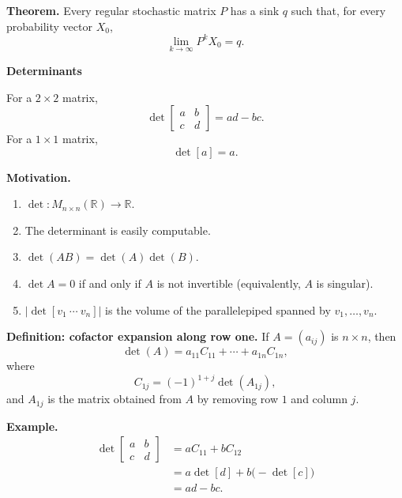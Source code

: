 \documentclass[letterpaper]{article}
\newcommand{\noteheader}[1]{\par\medskip\noindent\textbf{#1}\ }
\begin{document}
\clearpage

\textbf{Theorem.} Every regular stochastic matrix $P$ has a sink $q$ such that, for every probability vector $X_0$,
\[
\lim_{k\to\infty}P^kX_0=q.
\]

\bigskip

\noteheader{Determinants}

\medskip

For a $2\times2$ matrix,
\[
\det\begin{bmatrix}a&b\\c&d\end{bmatrix}=ad-bc.
\]
For a $1\times1$ matrix,
\[
\det[a]=a.
\]

\noteheader{Motivation.}
\begin{enumerate}
\item $\det:M_{n\times n}(\mathbb{R})\to\mathbb{R}$.
\item The determinant is easily computable.
\item $\det(AB)=\det(A)\det(B)$.
\item $\det A=0$ if and only if $A$ is not invertible (equivalently, $A$ is singular).
\item $|\det[v_1\ \cdots\ v_n]|$ is the volume of the parallelepiped spanned by $v_1,\ldots,v_n$.
\end{enumerate}

\begin{center}
\end{center}

\clearpage

\textbf{Definition: cofactor expansion along row one.} If $A=(a_{ij})$ is $n\times n$, then
\[
\det(A)=a_{11}C_{11}+\cdots+a_{1n}C_{1n},
\]
where
\[
C_{1j}=(-1)^{1+j}\det(A_{1j}),
\]
and $A_{1j}$ is the matrix obtained from $A$ by removing row $1$ and column $j$.

\noteheader{Example.}
\begin{align*}
\det\begin{bmatrix}a&b\\c&d\end{bmatrix}
&=aC_{11}+bC_{12}\\
&=a\det[d]+b\bigl(-\det[c]\bigr)\\
&=ad-bc.
\end{align*}
\end{document}
